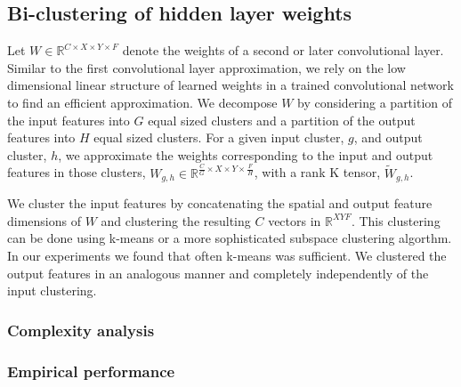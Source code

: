 \subsection{Bi-clustering of hidden layer weights}
Let $W \in \mathbb{R}^{C \times X \times Y \times F}$ denote the weights of a second or later convolutional layer. Similar to the first convolutional layer approximation, we rely on the low dimensional linear structure of learned weights in a trained convolutional network to find an efficient approximation. We decompose $W$ by considering a partition of the input features into $G$ equal sized clusters and a partition of the output features into $H$ equal sized clusters. For a given input cluster, $g$, and output cluster, $h$, we approximate the weights corresponding to the input and output features in those clusters, $W_{g,h} \in \mathbb{R}^{\frac{C}{G} \times X \times Y \times \frac{F}{H}}$, with a rank K tensor, $\tilde{W}_{g,h}$.  

We cluster the input features by concatenating the spatial and output feature dimensions of $W$ and clustering the resulting $C$ vectors in $\mathbb{R}^{XYF}$. This clustering can be done using k-means or a more sophisticated subspace clustering algorthm. In our experiments we found that often k-means was sufficient. We clustered the output features in an analogous manner and completely independently of the input clustering. 


\subsubsection{Complexity analysis}

\subsubsection{Empirical performance}


